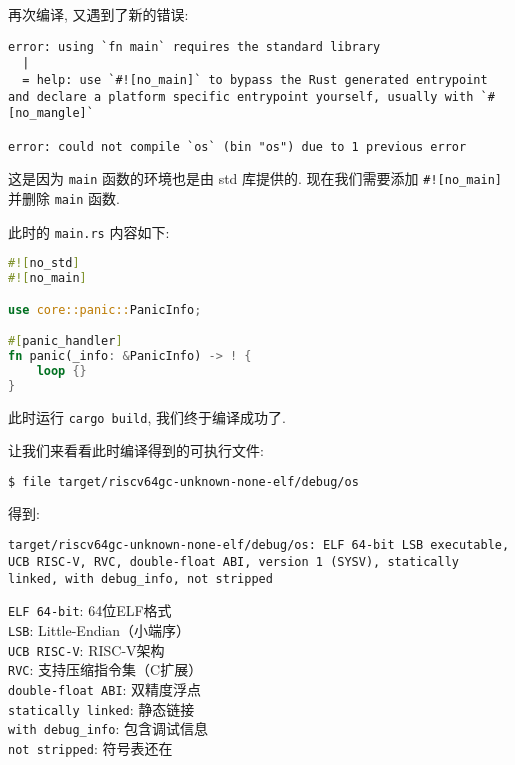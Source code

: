 \documentclass[a4paper]{ctexart}
\begin{document}
再次编译, 又遇到了新的错误:
\begin{lstlisting}
error: using `fn main` requires the standard library
  |
  = help: use `#![no_main]` to bypass the Rust generated entrypoint and declare a platform specific entrypoint yourself, usually with `#[no_mangle]`

error: could not compile `os` (bin "os") due to 1 previous error
\end{lstlisting}
这是因为 \verb|main| 函数的环境也是由 std 库提供的.
现在我们需要添加 \verb|#![no_main]| 并删除 \verb|main| 函数.

此时的 \verb|main.rs| 内容如下:
\begin{lstlisting}[language=rust]
#![no_std]
#![no_main]

use core::panic::PanicInfo;

#[panic_handler]
fn panic(_info: &PanicInfo) -> ! {
    loop {}
}
\end{lstlisting}

此时运行 \verb|cargo build|, 我们终于编译成功了.

让我们来看看此时编译得到的可执行文件:
\begin{lstlisting}[language=bash]
$ file target/riscv64gc-unknown-none-elf/debug/os
\end{lstlisting}
得到:
\begin{lstlisting}
target/riscv64gc-unknown-none-elf/debug/os: ELF 64-bit LSB executable, UCB RISC-V, RVC, double-float ABI, version 1 (SYSV), statically linked, with debug_info, not stripped
\end{lstlisting}
\verb|ELF 64-bit|: 64位ELF格式\\
\verb|LSB|: Little-Endian（小端序）\\
\verb|UCB RISC-V|: RISC-V架构\\
\verb|RVC|: 支持压缩指令集（C扩展）\\
\verb|double-float ABI|: 双精度浮点\\
\verb|statically linked|: 静态链接\\
\verb|with debug_info|: 包含调试信息\\
\verb|not stripped|: 符号表还在
\end{document}
